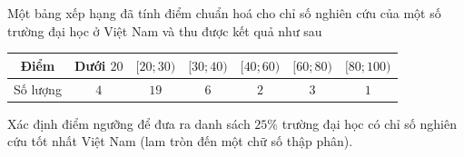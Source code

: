 \begin{bt}%

	Một bảng xếp hạng đã tính điểm chuẩn hoá cho chỉ số nghiên cứu của một số trường đại học ở Việt Nam và thu được kết quả như sau
	\begin{center}
		\begin{tabular}{|c|c|c|c|c|c|c|}
			\hline 
			Điểm  & Dưới $20$ &$[20;30)$&$[30;40)$&$[40;60)$&  $[60;80)$&$[80;100)$\\
			\hline 
			Số lượng&$4$&$19$&$6$&$2$&$3$&$1$\\
			\hline 
		\end{tabular}
	\end{center}	
	Xác định điểm ngưỡng để đưa ra danh sách $25\%$ trường đại học có chỉ số nghiên cứu tốt nhất Việt Nam (lam tròn đến một chữ số thập phân).
\end{bt}

